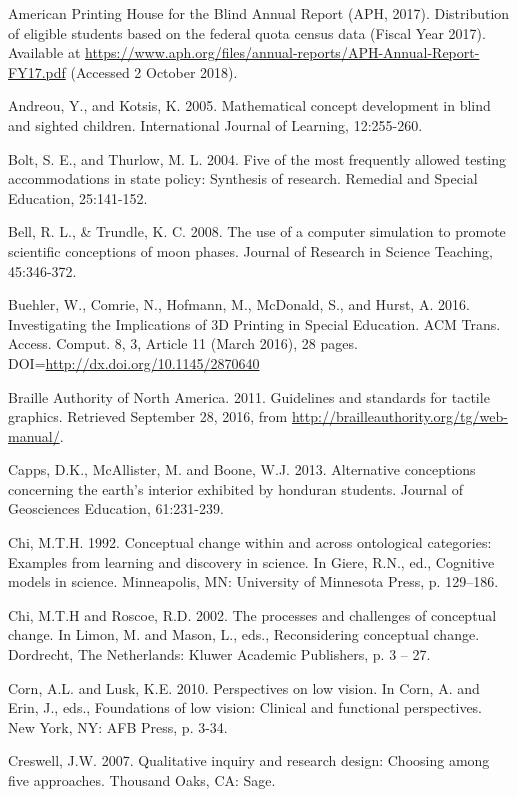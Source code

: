 \documentclass[11.5pt]{sig-alternate} %
\begin{document}
American Printing House for the Blind Annual Report (APH, 2017).  Distribution of eligible students based on the federal quota census data (Fiscal Year 2017). Available at \url{https://www.aph.org/files/annual-reports/APH-Annual-Report-FY17.pdf} (Accessed 2 October 2018).

Andreou, Y., and Kotsis, K.  2005. Mathematical concept development in blind and sighted children.  International Journal of Learning, 12:255-260.

Bolt, S. E., and Thurlow, M. L. 2004. Five of the most frequently allowed testing accommodations in state policy: Synthesis of research. Remedial and Special Education, 25:141-152.

Bell, R. L., \& Trundle, K. C. 2008. The use of a computer simulation to promote scientific conceptions of moon phases.  Journal of Research in Science Teaching, 45:346-372.

Buehler, W., Comrie, N., Hofmann, M., McDonald, S., and Hurst, A. 2016. Investigating the Implications of 3D Printing in Special Education. ACM Trans. Access. Comput. 8, 3, Article 11 (March 2016), 28 pages. DOI=\url{http://dx.doi.org/10.1145/2870640}

Braille Authority of North America. 2011. Guidelines and standards for tactile graphics.  Retrieved September 28, 2016, from \url{http://brailleauthority.org/tg/web-manual/}.

Capps, D.K., McAllister, M. and Boone, W.J. 2013.  Alternative conceptions concerning the earth’s interior exhibited by honduran students. Journal of Geosciences Education, 61:231-239.   

Chi, M.T.H. 1992. Conceptual change within and across ontological categories:  Examples from learning and discovery in science. In Giere, R.N., ed., Cognitive models in science.  Minneapolis, MN:  University of Minnesota Press, p. 129–186.

Chi, M.T.H and Roscoe, R.D. 2002.  The processes and challenges of conceptual change. In Limon, M. and Mason, L., eds., Reconsidering conceptual change. Dordrecht, The Netherlands:  Kluwer Academic Publishers, p. 3 – 27.

Corn, A.L. and Lusk, K.E. 2010.  Perspectives on low vision.  In Corn, A. and Erin, J., eds., Foundations of low vision:  Clinical and functional perspectives. New York, NY: AFB Press, p. 3-34.

Creswell, J.W. 2007. Qualitative inquiry and research design:  Choosing among five approaches. Thousand Oaks, CA: Sage.
\end{document}
